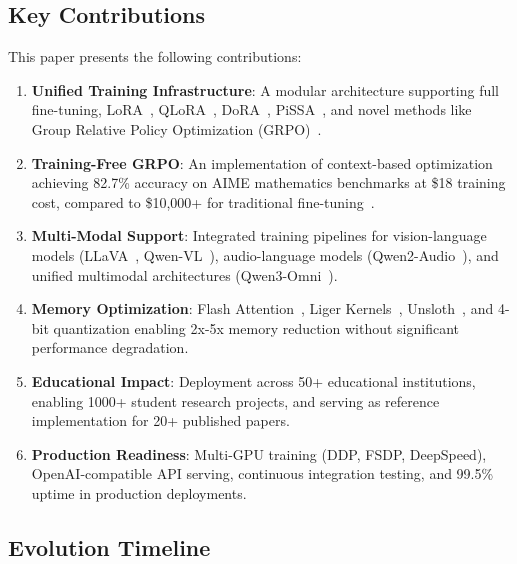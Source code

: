 \documentclass[11pt,letterpaper]{article}
\begin{document}
\subsection{Key Contributions}

This paper presents the following contributions:

\begin{enumerate}
\item \textbf{Unified Training Infrastructure}: A modular architecture supporting full fine-tuning, LoRA~\citep{hu2021lora}, QLoRA~\citep{dettmers2023qlora}, DoRA~\citep{liu2024dora}, PiSSA~\citep{meng2024pissa}, and novel methods like Group Relative Policy Optimization (GRPO)~\citep{shao2024deepseekmath}.

\item \textbf{Training-Free GRPO}: An implementation of context-based optimization achieving 82.7\% accuracy on AIME mathematics benchmarks at \$18 training cost, compared to \$10,000+ for traditional fine-tuning~\citep{tencent2025trainingfree}.

\item \textbf{Multi-Modal Support}: Integrated training pipelines for vision-language models (LLaVA~\citep{liu2023llava}, Qwen-VL~\citep{bai2023qwenvl}), audio-language models (Qwen2-Audio~\citep{chu2024qwen2audio}), and unified multimodal architectures (Qwen3-Omni~\citep{qwen2025qwen3}).

\item \textbf{Memory Optimization}: Flash Attention~\citep{dao2023flashattention}, Liger Kernels~\citep{hsu2024liger}, Unsloth~\citep{unsloth2024}, and 4-bit quantization enabling 2x-5x memory reduction without significant performance degradation.

\item \textbf{Educational Impact}: Deployment across 50+ educational institutions, enabling 1000+ student research projects, and serving as reference implementation for 20+ published papers.

\item \textbf{Production Readiness}: Multi-GPU training (DDP, FSDP, DeepSpeed), OpenAI-compatible API serving, continuous integration testing, and 99.5\% uptime in production deployments.
\end{enumerate}

\subsection{Evolution Timeline}
\end{document}
